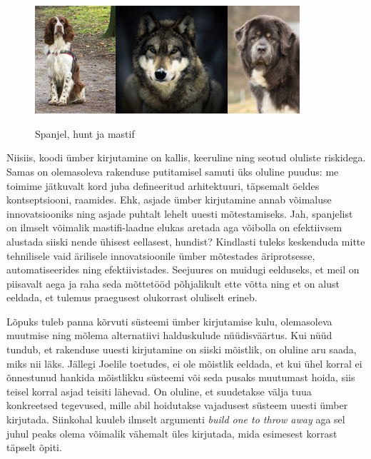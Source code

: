 \documentclass{tufte-book}
\begin{document}
\begin{figure}[htp]
	\begin{center}
		\includegraphics[height=4cm]{spaniel.jpg}\includegraphics[height=4cm]{wolf.jpg}\includegraphics[height=4cm]{mastiff.jpg}
		\caption{Spanjel, hunt ja mastif}
	\end{center}
\end{figure}

Niisiis, koodi ümber kirjutamine on kallis, keeruline ning seotud oluliste riskidega. Samas on olemasoleva rakenduse putitamisel samuti üks oluline puudus: me toimime jätkuvalt kord juba defineeritud arhitektuuri, täpsemalt öeldes kontseptsiooni, raamides. Ehk, asjade ümber kirjutamine annab võimaluse innovatsiooniks ning asjade puhtalt lehelt uuesti mõtestamiseks. Jah, spanjelist on ilmselt võimalik mastifi-laadne elukas aretada aga võibolla on efektiivsem alustada siiski nende ühisest eellasest, hundist? Kindlasti tuleks keskenduda mitte tehnilisele vaid ärilisele innovatsioonile ümber mõtestades äriprotsesse, automatiseerides ning efektiivistades. Seejuures on muidugi eelduseks, et meil on piisavalt aega ja raha seda mõttetööd põhjalikult ette võtta ning et on alust eeldada, et tulemus praegusest olukorrast oluliselt erineb.

Lõpuks tuleb panna kõrvuti süsteemi ümber kirjutamise kulu, olemasoleva muutmise ning mõlema alternatiivi halduskulude nüüdisväärtus. Kui nüüd tundub, et rakenduse uuesti kirjutamine on siiski mõistlik, on oluline aru saada, miks nii läks. Jällegi Joelile toetudes, ei ole mõistlik eeldada, et kui ühel korral ei õnnestunud hankida mõistlikku süsteemi või seda pusaks muutumast hoida, siis teisel korral asjad teisiti lähevad. On oluline, et suudetakse välja tuua konkreetsed tegevused, mille abil hoidutakse vajadusest süsteem uuesti ümber kirjutada. Siinkohal kuuleb ilmselt argumenti \emph{build one to throw away} aga sel juhul peaks olema võimalik vähemalt üles kirjutada, mida esimesest korrast täpselt õpiti.
\end{document}
